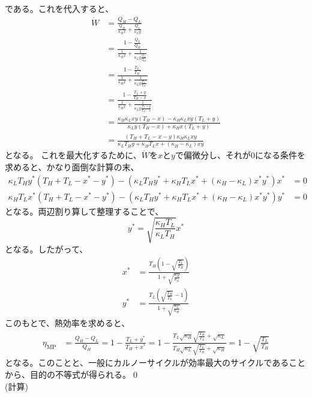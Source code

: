 \documentclass[a4paper,11pt]{jsarticle}
\numberwithin{equation}{section}
\begin{document}
である。これを代入すると、
\begin{align}
  \dot{W} &= \frac{Q_{H} - Q_{L}}{\frac{Q_{H}}{\kappa_{H}x} + \frac{Q_{L}}{\kappa_{L}y}}\\
  &= \frac{1-\frac{Q_{L}}{Q_{H}}}{\frac{1}{\kappa_{H}x} + \frac{1}{\kappa_{L}y\frac{Q_{L}}{Q_{H}}}}\\
  &= \frac{1-\frac{T_{L}'}{T_{H}'}}{\frac{1}{\kappa_{H}x} + \frac{1}{\kappa_{L}y\frac{T_{L}'}{T_{H}'}}}\\
  &= \frac{1-\frac{T_{L}+y}{T_{H}-x}}{\frac{1}{\kappa_{H}x} + \frac{1}{\kappa_{L}y\frac{T_{L}+y}{T_{H}-x}}}\\
  &= \frac{\kappa_{H}\kappa_{L}xy(T_{H}-x)-\kappa_{H}\kappa_{L}xy(T_{L}+y)}{\kappa_{L}y(T_{H}-x)+\kappa_{H}x(T_{L}+y)}\\
  &= \frac{(T_H + T_L - x - y)\kappa_H \kappa_L xy}{\kappa_L T_H y + \kappa_H T_L x + (\kappa_H - \kappa_L) xy}
\end{align}
となる。
これを最大化するために、$\dot{W}$を$x$と$y$で偏微分し、それが0になる条件を求めると、かなり面倒な計算の末、
\begin{align}
  \kappa_L T_H y^*(T_H + T_L - x^* - y^*) - (\kappa_L T_H y^* + \kappa_H T_L x^* + (\kappa_H - \kappa_L) x^* y^*) x^* &= 0\\
  \kappa_H T_L x^*(T_H + T_L - x^* - y^*) - (\kappa_L T_H y^* + \kappa_H T_L x^* + (\kappa_H - \kappa_L) x^* y^*) y^* &= 0
\end{align}
となる。両辺割り算して整理することで、
\begin{equation}
  y^* = \sqrt{\frac{\kappa_H T_L}{\kappa_L T_H}}x^*
\end{equation}
となる。したがって、
\begin{align}
  x^* &= \frac{T_H \left(1 - \sqrt{\frac{T_L}{T_H}} \right)}{1 + \sqrt{\frac{\kappa_H}{\kappa_L}}}\\
  y^* &= \frac{T_L \left(\sqrt{\frac{T_H}{T_L}} - 1\right)}{1 + \sqrt{\frac{\kappa_L}{\kappa_H}}}
\end{align}
このもとで、熱効率を求めると、
\begin{align}
  \eta_{\text{MP}} &= \frac{Q_H - Q_L}{Q_H} = 1 - \frac{T_L + y^*}{T_H + x^*} = 1 - \frac{T_L \sqrt{\kappa_H} \sqrt{\frac{T_H}{T_L}} + \sqrt{\kappa_L}}{T_H \sqrt{\kappa_L} \sqrt{\frac{T_L}{T_H}} + \sqrt{\kappa_H}} = 1 - \sqrt{\frac{T_L}{T_H}}
\end{align}
となる。このことと、一般にカルノーサイクルが効率最大のサイクルであることから、目的の不等式が得られる。\qed\\
(計算)\\
\end{document}
